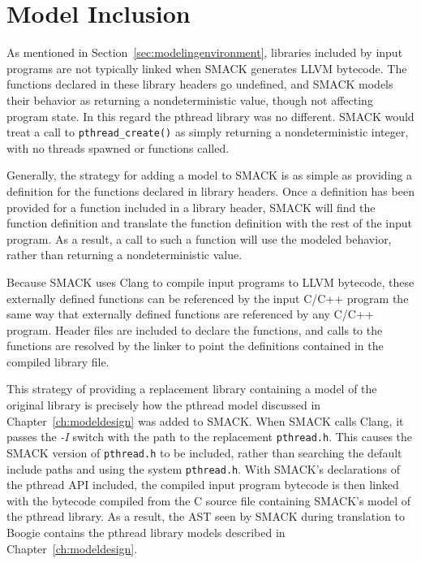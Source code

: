 \section{Model Inclusion}
As mentioned in Section~\ref{sec:modelingenvironment}, libraries
included by input programs are not typically linked when SMACK
generates LLVM bytecode.  The functions declared in these library
headers go undefined, and SMACK models their behavior as returning a
nondeterministic value, though not affecting program state.  In this
regard the pthread library was no different.  SMACK would treat a call
to \lstinline|pthread_create()| as simply returning a nondeterministic
integer, with no threads spawned or functions called. 

Generally, the strategy for adding a model to SMACK is as simple as
providing a definition for the functions declared in library headers.
Once a definition has been provided for a function included in a
library header, SMACK will find the function definition and translate
the function definition with the rest of the input program.  As a
result, a call to such a function will use the modeled behavior,
rather than returning a nondeterministic value.

Because SMACK uses Clang to compile input programs to LLVM bytecode,
these externally defined functions can be referenced by the input
C/C++ program the same way that externally defined functions are
referenced by any C/C++ program. Header files are included to declare
the functions, and calls to the functions are resolved by the linker
to point the definitions contained in the compiled library file.

This strategy of providing a replacement library containing a model
of the original library is precisely how the pthread model discussed
in Chapter~\ref{ch:modeldesign} was added to SMACK.  When SMACK calls
Clang, it passes the \emph{-I} switch with the path to the replacement
\lstinline[identifierstyle=\color{black}]|pthread.h|.  This causes the
SMACK version of \lstinline[identifierstyle=\color{black}]|pthread.h|
to be included, rather than searching the default include paths and
using the system \lstinline[identifierstyle=\color{black}]|pthread.h|.
With SMACK's declarations of the pthread API included, the compiled
input program bytecode is then linked with the bytecode compiled from
the C source file containing SMACK's model of the pthread library. As
a result, the AST seen by SMACK during translation to Boogie contains
the pthread library models described in Chapter~\ref{ch:modeldesign}.

